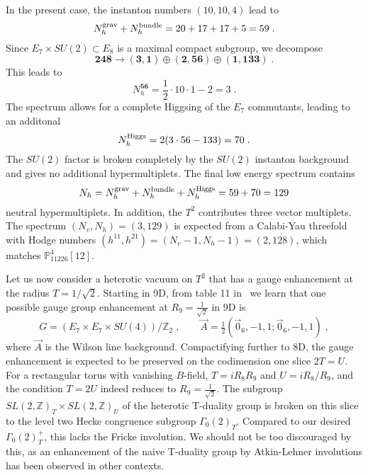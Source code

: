 \documentclass[11pt,a4paper]{article}
\numberwithin{equation}{section}
\numberwithin{table}{section}\setlength{\multlinegap}{25pt}
\begin{document}
In the present case, the instanton numbers $(10,10,4)$ lead to
\begin{equation}
    N_h^\textup{grav}+N_h^\textup{bundle}=20+17+17+5=59\;.
\end{equation}
Since $E_7\times SU(2)\subset E_8$ is a maximal compact subgroup, we decompose
\begin{equation}
    \mathbf{248}\to (\mathbf{3},\mathbf{1}) \oplus (\mathbf{2},\mathbf{56}) \oplus (\mathbf{1},\mathbf{133})\;.
\end{equation}
This leads to
\begin{equation}
        N_h^{\mathbf{56}}=\frac{1}{2}\cdot 10\cdot 1-2=3\;.
\end{equation}
The spectrum allows for a complete Higgsing of the $E_7$ commutants, leading to an additonal
\begin{equation}
    N_h^\textup{Higgs}=2(3\cdot 56-133)=70\;.
\end{equation}
The $SU(2)$ factor is broken completely by the $SU(2)$ instanton background and gives no additional hypermultiplets. The final low energy spectrum contains
\begin{equation}
    N_h=N_h^\textup{grav}+N_h^\textup{bundle}+N_h^\textup{Higgs}=59+70=129
\end{equation}
neutral hypermultiplets. In addition, the $T^2$ contributes three vector multiplets. The spectrum $(N_v,N_h)=(3,129)$ is expected from a Calabi-Yau threefold with Hodge numbers $(h^{11},h^{21})=(N_v-1,N_h-1)=(2,128)$, which matches $\mathbb{P}^4_{11226}[12]$.

Let us now consider a heterotic vacuum on $T^2$ that has a gauge enhancement at the radius $T=1/\sqrt{2}$. Starting in 9D, from table 11 in~\cite{Font:2020rsk} we learn that one possible gauge group enhancement at $R_9=\tfrac{1}{\sqrt{2}}$ in 9D is
\begin{equation}
    \label{eq:LevelTwoHeteroticGaugeGroups}
        G=\left(E_7\times E_7\times SU(4)\right)/\mathbb{Z}_2\;,\qquad \vec{A}=\tfrac12\left(\vec{0}_6,-1,1;\vec{0}_6,-1,1\right)\;,
    \end{equation}
where $\vec{A}$ is the Wilson line background. Compactifying further to 8D, the gauge enhancement is expected to be preserved on the codimension one slice $2T=U$. For a rectangular torus with vanishing $B$-field, $T=iR_8R_9$ and $U=iR_8/R_9$, and the condition $T=2U$ indeed reduces to $R_9=\tfrac{1}{\sqrt{2}}$. The subgroup $SL(2,\mathbb{Z})_T\times SL(2,\mathbb{Z})_U$ of the heterotic T-duality group is broken on this slice to the level two Hecke congruence subgroup $\Gamma_0(2)_T$. Compared to our desired $\Gamma_0(2)_T^+$, this lacks the Fricke involution. We should not be too discouraged by this, as an enhancement of the naive T-duality group by Atkin-Lehner involutions has been observed in other contexts\cite{Persson:2015jka,Paquette:2016xoo,Paquette:2017xui,Persson:2017lkn}.
\end{document}
